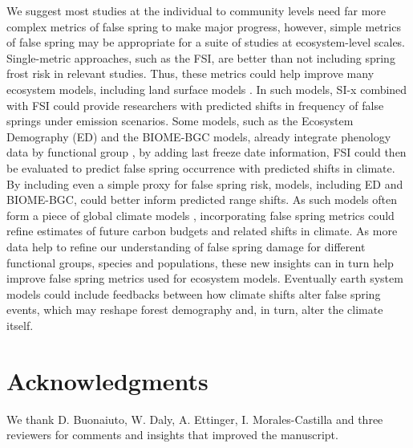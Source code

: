 \documentclass{article}\usepackage[]{graphicx}\usepackage[]{color}
\begin{document}
We suggest most studies at the individual to community levels need far more complex metrics of false spring to make major progress, however, simple metrics of false spring may be appropriate for a suite of studies at ecosystem-level scales. Single-metric approaches, such as the FSI, are better than not including spring frost risk in relevant studies. Thus, these metrics could help improve many ecosystem models, including land surface models \citep{Foley1998, Moorcroft2001, Prentice1992, Thornton2005}. In such models, SI-x combined with FSI could provide researchers with predicted shifts in frequency of false springs under emission scenarios. Some models, such as the Ecosystem Demography (ED) and the BIOME-BGC models, already integrate phenology data by functional group \citep{Kim2015, Moorcroft2001, Thornton2005}, by adding last freeze date information, FSI could then be evaluated to predict false spring occurrence with predicted shifts in climate. By including even a simple proxy for false spring risk, models, including ED and BIOME-BGC, could better inform predicted range shifts. As such models often form a piece of global climate models \citep{Yu2016}, incorporating false spring metrics could refine estimates of future carbon budgets and related shifts in climate. As more data help to refine our understanding of false spring damage for different functional groups, species and populations, these new insights can in turn help improve false spring metrics used for ecosystem models. Eventually earth system models could include feedbacks between how climate shifts alter false spring events, which may reshape forest demography and, in turn, alter the climate itself.  


\section*{Acknowledgments}
We thank D. Buonaiuto,  W. Daly, A. Ettinger, I. Morales-Castilla and three reviewers for comments and insights that improved the manuscript. 

\nocite{Schwartz1993}
\nocite{Barker2005}
\nocite{Sanchez2013}
\nocite{Longstroth2012}
\nocite{Barlow2015}
\nocite{Longstroth2013}
\nocite{Charrier2011}

\end{document}
